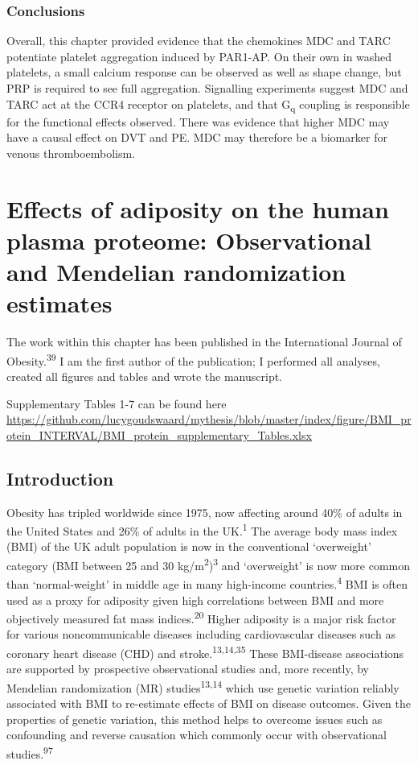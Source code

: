 \documentclass[11pt,twoside]{bristolthesis}
\begin{document}
\hypertarget{conclusions}{%
\subsection{Conclusions}\label{conclusions}}

Overall, this chapter provided evidence that the chemokines MDC and TARC potentiate platelet aggregation induced by PAR1-AP. On their own in washed platelets, a small calcium response can be observed as well as shape change, but PRP is required to see full aggregation. Signalling experiments suggest MDC and TARC act at the CCR4 receptor on platelets, and that G\textsubscript{q} coupling is responsible for the functional effects observed. There was evidence that higher MDC may have a causal effect on DVT and PE. MDC may therefore be a biomarker for venous thromboembolism.

\hypertarget{BMI-protein-MR}{%
\chapter{Effects of adiposity on the human plasma proteome: Observational and Mendelian randomization estimates}\label{BMI-protein-MR}}

The work within this chapter has been published in the International Journal of Obesity.\textsuperscript{39} I am the first author of the publication; I performed all analyses, created all figures and tables and wrote the manuscript.

Supplementary Tables 1-7 can be found here \url{https://github.com/lucygoudswaard/mythesis/blob/master/index/figure/BMI_protein_INTERVAL/BMI_protein_supplementary_Tables.xlsx}

\hypertarget{introduction-1}{%
\section{Introduction}\label{introduction-1}}

Obesity has tripled worldwide since 1975, now affecting around 40\% of adults in the United States and 26\% of adults in the UK.\textsuperscript{1} The average body mass index (BMI) of the UK adult population is now in the conventional `overweight' category (BMI between 25 and 30 kg/m\textsuperscript{2})\textsuperscript{3} and `overweight' is now more common than `normal-weight' in middle age in many high-income countries.\textsuperscript{4} BMI is often used as a proxy for adiposity given high correlations between BMI and more objectively measured fat mass indices.\textsuperscript{20} Higher adiposity is a major risk factor for various noncommunicable diseases including cardiovascular diseases such as coronary heart disease (CHD) and stroke.\textsuperscript{13,14,35} These BMI-disease associations are supported by prospective observational studies and, more recently, by Mendelian randomization (MR) studies\textsuperscript{13,14} which use genetic variation reliably associated with BMI to re-estimate effects of BMI on disease outcomes. Given the properties of genetic variation, this method helps to overcome issues such as confounding and reverse causation which commonly occur with observational studies.\textsuperscript{97}
\end{document}
